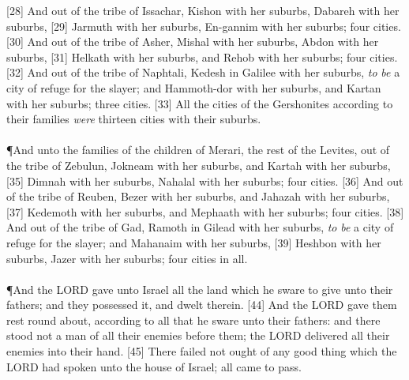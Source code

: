 [28] \textcolor[cmyk]{0.99998,1,0,0}{And out of the tribe of Issachar, Kishon with her suburbs, Dabareh with her suburbs,}
[29] \textcolor[cmyk]{0.99998,1,0,0}{Jarmuth with her suburbs, En-gannim with her suburbs; four cities.}
[30] \textcolor[cmyk]{0.99998,1,0,0}{And out of the tribe of Asher, Mishal with her suburbs, Abdon with her suburbs,}
[31] \textcolor[cmyk]{0.99998,1,0,0}{Helkath with her suburbs, and Rehob with her suburbs; four cities.}
[32] \textcolor[cmyk]{0.99998,1,0,0}{And out of the tribe of Naphtali, Kedesh in Galilee with her suburbs, \emph{to} \emph{be} a city of refuge for the slayer; and Hammoth-dor with her suburbs, and Kartan with her suburbs; three cities.}
[33] \textcolor[cmyk]{0.99998,1,0,0}{All the cities of the Gershonites according to their families \emph{were} thirteen cities with their suburbs.}\\
\\
\P \textcolor[cmyk]{0.99998,1,0,0}{And unto the families of the children of Merari, the rest of the Levites, out of the tribe of Zebulun, Jokneam with her suburbs, and Kartah with her suburbs,}
[35] \textcolor[cmyk]{0.99998,1,0,0}{Dimnah with her suburbs, Nahalal with her suburbs; four cities.}
[36] \textcolor[cmyk]{0.99998,1,0,0}{And out of the tribe of Reuben, Bezer with her suburbs, and Jahazah with her suburbs,}
[37] \textcolor[cmyk]{0.99998,1,0,0}{Kedemoth with her suburbs, and Mephaath with her suburbs; four cities.}
[38] \textcolor[cmyk]{0.99998,1,0,0}{And out of the tribe of Gad, Ramoth in Gilead with her suburbs, \emph{to} \emph{be} a city of refuge for the slayer; and Mahanaim with her suburbs,}
[39] \textcolor[cmyk]{0.99998,1,0,0}{Heshbon with her suburbs, Jazer with her suburbs; four cities in all.}\\
\\
\P \textcolor[cmyk]{0.99998,1,0,0}{And the LORD gave unto Israel all the land which he sware to give unto their fathers; and they possessed it, and dwelt therein.}
[44] \textcolor[cmyk]{0.99998,1,0,0}{And the LORD gave them rest round about, according to all that he sware unto their fathers: and there stood not a man of all their enemies before them; the LORD delivered all their enemies into their hand.}
[45] \textcolor[cmyk]{0.99998,1,0,0}{There failed not ought of any good thing which the LORD had spoken unto the house of Israel; all came to pass.}